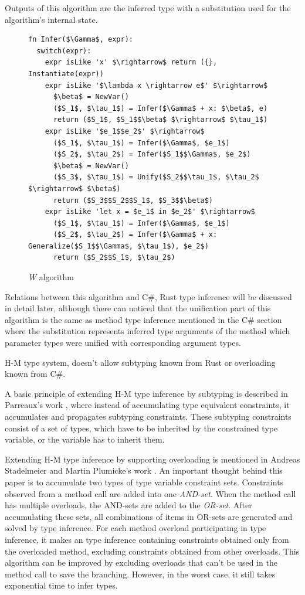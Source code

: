 Outputs of this algorithm are the inferred type with a substitution used for the algorithm's internal state. 
\begin{figure}
\begin{lstlisting}[style=myAlgo, mathescape=true]
fn Infer($\Gamma$, expr):
  switch(expr):
    expr isLike 'x' $\rightarrow$ return ({}, Instantiate(expr))
    expr isLike '$\lambda x \rightarrow e$' $\rightarrow$
      $\beta$ = NewVar()
      ($S_1$, $\tau_1$) = Infer($\Gamma$ + x: $\beta$, e)
      return ($S_1$, $S_1$$\beta$ $\rightarrow$ $\tau_1$)
    expr isLike '$e_1$$e_2$' $\rightarrow$
      ($S_1$, $\tau_1$) = Infer($\Gamma$, $e_1$)
      ($S_2$, $\tau_2$) = Infer($S_1$$\Gamma$, $e_2$)
      $\beta$ = NewVar()
      ($S_3$, $\tau_1$) = Unify($S_2$$\tau_1$, $\tau_2$ $\rightarrow$ $\beta$)
      return ($S_3$$S_2$$S_1$, $S_3$$\beta$)
    expr isLike 'let x = $e_1$ in $e_2$' $\rightarrow$
      ($S_1$, $\tau_1$) = Infer($\Gamma$, $e_1$)
      ($S_2$, $\tau_2$) = Infer($\Gamma$ + x: Generalize($S_1$$\Gamma$, $\tau_1$), $e_2$)
      return ($S_2$$S_1$, $\tau_2$)
\end{lstlisting}
\caption{\textit{W} algorithm}
\label{img16:w}
\end{figure}
\par
Relations between this algorithm and C\#, Rust type inference will be discussed in detail later, although there can noticed that the unification part of this algorithm is the same as method type inference mentioned in the C\# section where the substitution represents inferred type arguments of the method which parameter types were unified with corresponding argument types.
\par
H-M type system, doesn't allow subtyping known from Rust or overloading known from C\#.  
\par
A basic principle of extending H-M type inference by subtyping is described in Parreaux's work \cite{paper:Parreaux}, where instead of accumulating type equivalent constraints, it accumulates and propagates subtyping constraints.
These subtyping constraints consist of a set of types, which have to be inherited by the constrained type variable, or the variable has to inherit them.
\par
Extending H-M type inference by supporting overloading is mentioned in Andreas Stadelmeier and Martin Plumicke's work \cite{paper:Overloading}.
An important thought behind this paper is to accumulate two types of type variable constraint sets.
Constraints observed from a method call are added into one \textit{AND-set}.
When the method call has multiple overloads, the AND-sets are added to the \textit{OR-set}.
After accumulating these sets, all combinations of items in OR-sets are generated and solved by type inference.
For each method overload participating in type inference, it makes an type inference containing constraints obtained only from the overloaded method, excluding constraints obtained from other overloads.
This algorithm can be improved by excluding overloads that can't be used in the method call to save the branching.
However, in the worst case, it still takes exponential time to infer types.

